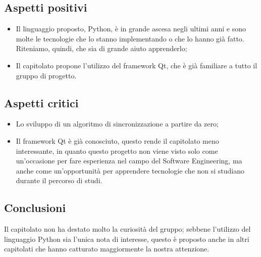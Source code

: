 \subsection{Aspetti positivi}
\begin{itemize}
\item Il linguaggio proposto, Python, è in grande ascesa negli ultimi anni e sono molte le tecnologie che lo stanno implementando o che lo hanno già fatto. Riteniamo, quindi, che sia di grande aiuto apprenderlo;
\item Il capitolato propone l'utilizzo del framework Qt, che è già familiare a tutto il gruppo di progetto.
\end{itemize}

\subsection{Aspetti critici}
\begin{itemize}
\item Lo sviluppo di un algoritmo di sincronizzazione a partire da zero;
\item Il framework Qt è già conosciuto, questo rende il capitolato meno interessante, in quanto questo progetto non viene visto solo come un'occasione per fare esperienza nel campo del Software Engineering, ma anche come un'opportunità per apprendere tecnologie che non si studiano durante il percorso di studi.
\end{itemize}

\subsection{Conclusioni}
Il capitolato non ha destato molto la curiosità del gruppo; sebbene l'utilizzo del linguaggio Python sia l'unica nota di interesse, questo è proposto anche in altri capitolati che hanno catturato maggiormente la nostra attenzione.
